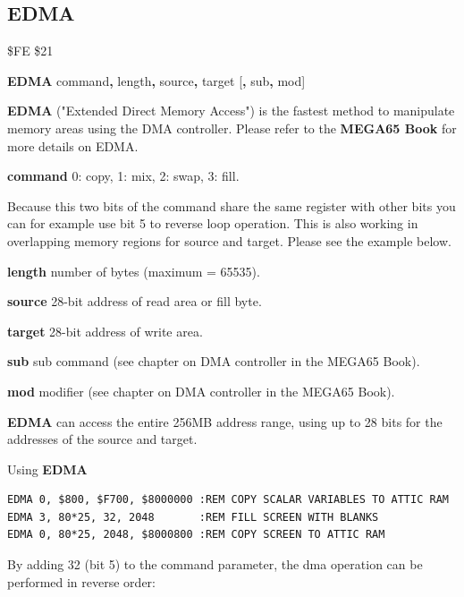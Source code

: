 \subsection{EDMA}
\label{BASIC 65 Commands!EDMA}
\begin{description}[leftmargin=2cm,style=nextline]
\item [Token:] \$FE \$21
\item [Format:] {\bf EDMA} command{\bf,} length{\bf,} source{\bf,}
                 target [{\bf,} sub{\bf,} mod]
\item [Usage:]
   {\bf EDMA} ("Extended Direct Memory Access") is the fastest method
   to manipulate memory areas using the DMA controller. Please refer to
\ifdefined\printmanual
the {\bf MEGA65 Book}
\else
{}
\fi
   for more details on EDMA.

   {\bf command} 0: copy, 1: mix, 2: swap, 3: fill.

   Because this two bits of the command share the same register with other
   bits you can for example use bit 5 to reverse loop operation. This is
   also working in overlapping memory regions for source and target. Please
   see the example below.

   {\bf length} number of bytes (maximum = 65535).

   {\bf source}  28-bit address of read area or fill byte.

   {\bf target} 28-bit address of write area.

   {\bf sub} sub command (see chapter on DMA controller in the MEGA65 Book).

   {\bf mod} modifier (see chapter on DMA controller in the MEGA65 Book).

\item [Remarks:]
{\bf EDMA} can access the entire 256MB address range,
using up to 28 bits for the addresses of the source and target.
\item [Examples:] Using {\bf EDMA}
\begin{tcolorbox}[colback=black,coltext=white]
\verbatimfont{\codefont}
\begin{verbatim}
EDMA 0, $800, $F700, $8000000 :REM COPY SCALAR VARIABLES TO ATTIC RAM
EDMA 3, 80*25, 32, 2048       :REM FILL SCREEN WITH BLANKS
EDMA 0, 80*25, 2048, $8000800 :REM COPY SCREEN TO ATTIC RAM
\end{verbatim}
\end{tcolorbox}

   By adding 32 (bit 5) to the command parameter, the dma operation can be
   performed in reverse order:


\end{description}
